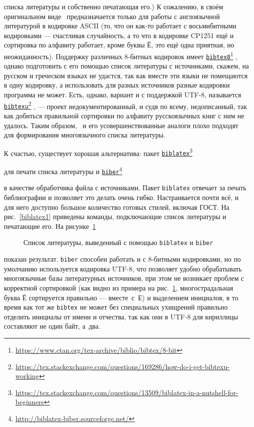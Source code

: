 \documentclass[a4paper,12pt]{article}
\newcommand\foothref[2]{%
  \href{#1}{#2}\footnote{\url{#1}}%
}
\newcommand\package[1]{\texttt{#1}}
\newcommand\exe[1]{\texttt{#1}}
\begin{document}
списка литературы и собственно печатающая его.)
К сожалению, в своём оригинальном виде \BibTeX\ предназначается только
для работы с англоязычной литературой в кодировке ASCII (то, что
он как-то работает с восьмибитными кодировками --- счастливая случайность,
а то что в кодировке CP1251 ещё и сортировка по алфавиту работает,
кроме буквы Ё, это ещё одна приятная, но неожиданность). Поддержку различных
8-битных кодировок имеет
\foothref{https://www.ctan.org/tex-archive/biblio/bibtex/8-bit}{\exe{bibtex8}},
однако подготовить с его помощью
список литературы с источниками, скажем, на русском и греческом языках
не удастся, так как вместе эти языки не помещаются в одну кодировку, а
использовать для разных источников разные кодировки программа не может.
Есть, однако, вариант и с поддержкой UTF-8, называется
\foothref{https://tex.stackexchange.com/questions/169286/how-do-i-get-bibtexu-working}{\exe{bibtexu}},
--- проект недокументированный, и судя по всему, недописанный, так как
добиться правильной сортировки по алфавиту русскоязычных книг с ним
не удалось. Таким образом, \BibTeX\ и его усовершенствованные аналоги
плохо подходят для формирования многоязычного списка литературы.

К счастью, существует хорошая альтернатива: пакет
\foothref{https://tex.stackexchange.com/questions/13509/biblatex-in-a-nutshell-for-beginners}{\package{biblatex}}
для печати списка литературы и
\foothref{http://biblatex-biber.sourceforge.net/}{\exe{biber}}
в качестве обработчика файла с источниками.
Пакет \package{biblatex} отвечает за печать библиографии и позволяет
это делать очень гибко. Настраивается почти всё, и для него доступно большое
количество готовых стилей, включая ГОСТ. На рис.~\ref{biblatex1}
приведены
команды, подключающие список литературы и печатающие его. На рисунке~\ref{biblatex2}%
\nocite{yolkin1997,esin1950,eliseeva2010,chebyshev1859}%
%
%
\begin{figure}[tp]
\begin{tcolorbox}[colback=white,colframe=white]
\centering
\small
\printbibliography
\end{tcolorbox}
\caption{Список литературы, выведенный с помощью \package{biblatex} и \exe{biber}}\label{biblatex2}
\end{figure}
показан результат.
\exe{biber} способен работать и с 8-битными кодировками, но по умолчанию
используется кодировка UTF-8, что позволяет удобно обрабатывать многоязычные
базы литературных источников, при этом не возникает проблем с корректной сортировкой
(как видно из примера на рис.~\ref{biblatex2}, многострадальная буква Ё
сортируется правильно --- вместе~с~Е) и выделением инициалов, в то время как
тот же \exe{bibtex} не может без специальных ухищрений правильно отделить
инициалы от имени и отчества, так как они в UTF-8 для кириллицы составляют не
один байт, а~два.
\end{document}
